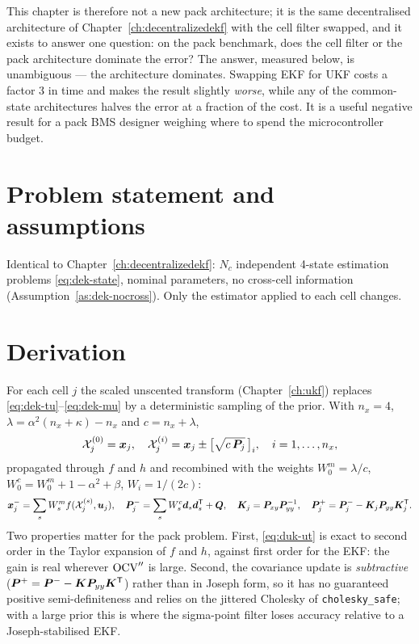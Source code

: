 This chapter is therefore not a new pack architecture; it is the same decentralised architecture
of Chapter~\ref{ch:decentralizedekf} with the cell filter swapped, and it exists to answer one
question: on the pack benchmark, does the cell filter or the pack architecture dominate the error?
The answer, measured below, is unambiguous --- the architecture dominates. Swapping EKF for UKF
costs a factor \num{3} in time and makes the result slightly \emph{worse}, while any of the
common-state architectures halves the error at a fraction of the cost. It is a useful negative
result for a pack BMS designer weighing where to spend the microcontroller budget.

\section{Problem statement and assumptions}
Identical to Chapter~\ref{ch:decentralizedekf}: $N_c$ independent 4-state estimation problems
\eqref{eq:dek-state}, nominal parameters, no cross-cell information
(Assumption~\ref{as:dek-nocross}). Only the estimator applied to each cell changes.

\section{Derivation}
For each cell $j$ the scaled unscented transform (Chapter~\ref{ch:ukf}) replaces
\eqref{eq:dek-tu}--\eqref{eq:dek-mu} by a deterministic sampling of the prior. With
$n_x=4$, $\lambda = \alpha^2(n_x+\kappa)-n_x$ and $c = n_x+\lambda$,
\begin{equation}
\mathcal{X}_{j}^{(0)} = \bm{x}_j,\quad
\mathcal{X}_{j}^{(i)} = \bm{x}_j \pm \big[\sqrt{c\,\bm{P}_j}\,\big]_i,\quad i=1,\dots,n_x,
\label{eq:duk-sigma}
\end{equation}
propagated through $f$ and $h$ and recombined with the weights
$W^m_0=\lambda/c$, $W^c_0 = W^m_0 + 1-\alpha^2+\beta$, $W_i = 1/(2c)$:
\begin{equation}
\bm{x}^-_j=\sum_s W^m_s f(\mathcal{X}^{(s)}_j,\bm{u}_j),\quad
\bm{P}^{-}_j=\sum_s W^c_s \bm{d}_s\bm{d}_s^{\mathsf{T}} + \bm{Q},\quad
\bm{K}_j = \bm{P}_{xy}\bm{P}_{yy}^{-1},\quad
\bm{P}^{+}_j = \bm{P}^{-}_j - \bm{K}_j\bm{P}_{yy}\bm{K}_j^{\mathsf{T}} .
\label{eq:duk-ut}
\end{equation}
Two properties matter for the pack problem. First, \eqref{eq:duk-ut} is exact to second order in
the Taylor expansion of $f$ and $h$, against first order for the EKF: the gain is real wherever
$\mathrm{OCV}''$ is large. Second, the covariance update is \emph{subtractive}
($\bm{P}^{+}=\bm{P}^{-}-\bm{K}\bm{P}_{yy}\bm{K}^{\mathsf{T}}$) rather than in Joseph form, so it has no guaranteed positive
semi-definiteness and relies on the jittered Cholesky of \texttt{cholesky\_safe}; with a large
prior this is where the sigma-point filter loses accuracy relative to a Joseph-stabilised EKF.

